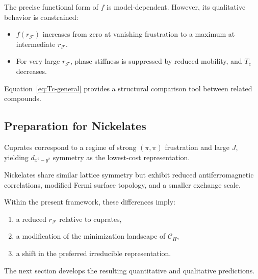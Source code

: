     The precise functional form of $f$
    is model-dependent.
    However,
    its qualitative behavior is constrained:

    \begin{itemize}
      \item
      $f(r_{\mathcal F})$ increases
      from zero at vanishing frustration
      to a maximum at intermediate $r_{\mathcal F}$.

      \item
      For very large $r_{\mathcal F}$,
      phase stiffness is suppressed by reduced mobility,
      and $T_c$ decreases.
    \end{itemize}

    Equation~\ref{eq:Tc-general}
    provides a structural comparison tool
    between related compounds.

  \subsection{Preparation for Nickelates}
    \label{subsec:preparation-nickelates}

    Cuprates correspond to a regime
    of strong $(\pi,\pi)$ frustration
    and large $J$,
    yielding $d_{x^2-y^2}$ symmetry
    as the lowest-cost representation.

    Nickelates share similar lattice symmetry
    but exhibit reduced antiferromagnetic correlations,
    modified Fermi surface topology,
    and a smaller exchange scale.

    Within the present framework,
    these differences imply:

    \begin{enumerate}
      \item
      a reduced $r_{\mathcal F}$ relative to cuprates,

      \item
      a modification of the minimization landscape
      of $\mathcal{C}_{\Pi}$,

      \item
      a shift in the preferred irreducible representation.
    \end{enumerate}

    The next section develops
    the resulting quantitative and qualitative predictions.
